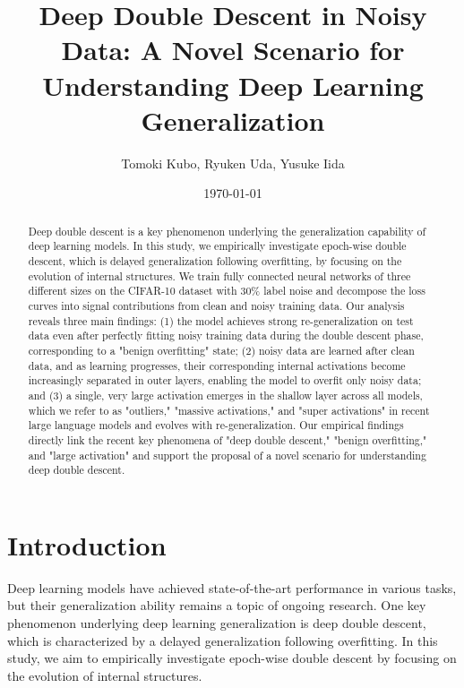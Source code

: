 \documentclass[12pt,a4paper]{article}
\begin{document}
\title{Deep Double Descent in Noisy Data: A Novel Scenario for Understanding Deep Learning Generalization}

\author{Tomoki Kubo, Ryuken Uda, Yusuke Iida}

\date{\today}

\maketitle

\begin{abstract}
Deep double descent is a key phenomenon underlying the generalization capability of deep learning models. In this study, we empirically investigate epoch-wise double descent, which is delayed generalization following overfitting, by focusing on the evolution of internal structures. We train fully connected neural networks of three different sizes on the CIFAR-10 dataset with 30\% label noise and decompose the loss curves into signal contributions from clean and noisy training data. Our analysis reveals three main findings: (1) the model achieves strong re-generalization on test data even after perfectly fitting noisy training data during the double descent phase, corresponding to a "benign overfitting" state; (2) noisy data are learned after clean data, and as learning progresses, their corresponding internal activations become increasingly separated in outer layers, enabling the model to overfit only noisy data; and (3) a single, very large activation emerges in the shallow layer across all models, which we refer to as "outliers," "massive activations," and "super activations" in recent large language models and evolves with re-generalization. Our empirical findings directly link the recent key phenomena of "deep double descent," "benign overfitting," and "large activation" and support the proposal of a novel scenario for understanding deep double descent.
\end{abstract}

\section{Introduction}

Deep learning models have achieved state-of-the-art performance in various tasks, but their generalization ability remains a topic of ongoing research. One key phenomenon underlying deep learning generalization is deep double descent, which is characterized by a delayed generalization following overfitting. In this study, we aim to empirically investigate epoch-wise double descent by focusing on the evolution of internal structures.
\end{document}
